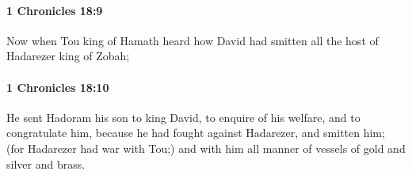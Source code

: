 		\paragraph{1 Chronicles 18:9} %
			\label{1CHRONICLES-18-9}

			Now when Tou king of Hamath heard how David had smitten all the host of Hadarezer king of Zobah;


		\paragraph{1 Chronicles 18:10} %
			\label{1CHRONICLES-18-10}

			He sent Hadoram his son to king David, to enquire of his welfare, and to congratulate him, because he had fought against Hadarezer, and smitten him; (for Hadarezer had war with Tou;) and with him all manner of vessels of gold and silver and brass.

